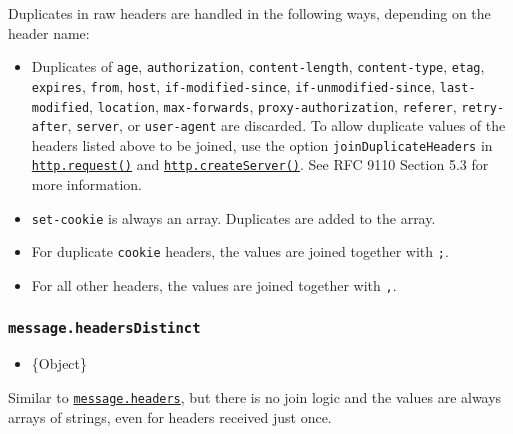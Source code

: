 Duplicates in raw headers are handled in the following ways, depending
on the header name:

\begin{itemize}
\tightlist
\item
  Duplicates of \texttt{age}, \texttt{authorization},
  \texttt{content-length}, \texttt{content-type}, \texttt{etag},
  \texttt{expires}, \texttt{from}, \texttt{host},
  \texttt{if-modified-since}, \texttt{if-unmodified-since},
  \texttt{last-modified}, \texttt{location}, \texttt{max-forwards},
  \texttt{proxy-authorization}, \texttt{referer}, \texttt{retry-after},
  \texttt{server}, or \texttt{user-agent} are discarded. To allow
  duplicate values of the headers listed above to be joined, use the
  option \texttt{joinDuplicateHeaders} in
  \hyperref[httprequestoptions-callback]{\texttt{http.request()}} and
  \hyperref[httpcreateserveroptions-requestlistener]{\texttt{http.createServer()}}.
  See RFC 9110 Section 5.3 for more information.
\item
  \texttt{set-cookie} is always an array. Duplicates are added to the
  array.
\item
  For duplicate \texttt{cookie} headers, the values are joined together
  with \texttt{;}.
\item
  For all other headers, the values are joined together with \texttt{,}.
\end{itemize}

\subsubsection{\texorpdfstring{\texttt{message.headersDistinct}}{message.headersDistinct}}\label{message.headersdistinct}

\begin{itemize}
\tightlist
\item
  \{Object\}
\end{itemize}

Similar to \hyperref[messageheaders]{\texttt{message.headers}}, but
there is no join logic and the values are always arrays of strings, even
for headers received just once.

\begin{Shaded}
\begin{Highlighting}[]
\CommentTok{//}
\NormalTok{)}\OperatorTok{;}
\end{Highlighting}
\end{Shaded}

